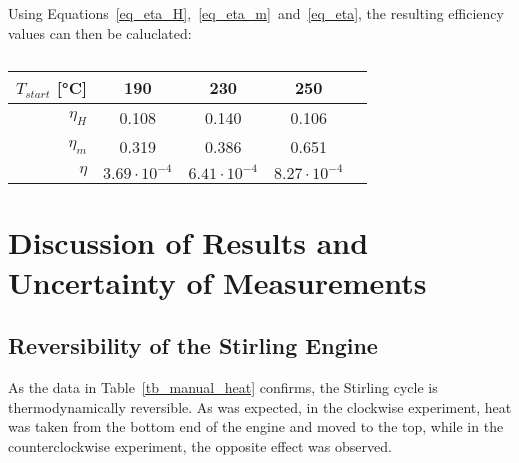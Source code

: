 \documentclass[titlepage]{article}
\begin{document}
Using Equations~\ref{eq_eta_H},~\ref{eq_eta_m}~and~\ref{eq_eta}, the resulting efficiency values can then be caluclated:

\begin{table}[H]
    \centering
    \caption{}
    \label{tb_efficiency_values}
    \begin{tabular}{|r||c|c|c|c|}
        \hline
        \(T_{start}\) [°C] & \textbf{190} & \textbf{230} & \textbf{250}
        \\
        \hline
        \hline
        \(\eta_H\) & 0.108 & 0.140 & 0.106
        \\
        \hline
        \(\eta_m\) & 0.319 & 0.386 & 0.651
        \\
        \hline
        \(\eta\) & \(3.69 \cdot 10^{-4}\) & \(6.41 \cdot 10^{-4}\) & \(8.27 \cdot 10^{-4}\)
        \\
        \hline
    \end{tabular}
\end{table}

\newpage
\section{Discussion of Results and Uncertainty of Measurements}
\subsection{Reversibility of the Stirling Engine}
As the data in Table~\ref{tb_manual_heat} confirms, the Stirling cycle is thermodynamically reversible. As was expected, in the clockwise experiment, heat was taken from the bottom end of the engine and moved to the top, while in the counterclockwise experiment, the opposite effect was observed.
\end{document}
